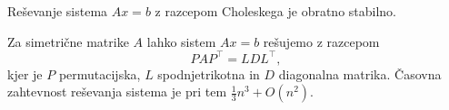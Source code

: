 \begin{opomba}
Reševanje sistema $Ax = b$ z razcepom Choleskega je obratno
stabilno.
\end{opomba}

\begin{opomba}
Za simetrične matrike $A$ lahko sistem $Ax = b$ rešujemo z razcepom
\[
PAP^\top = LDL^\top,
\]
kjer je $P$ permutacijska, $L$ spodnjetrikotna in $D$ diagonalna
matrika. Časovna zahtevnost reševanja sistema je pri tem
$\frac{1}{3} n^3 + O(n^2)$.
\end{opomba}
